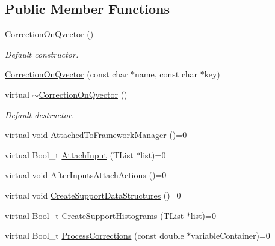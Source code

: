 \subsection*{Public Member Functions}
\begin{DoxyCompactItemize}
\item 
\mbox{\label{classQn_1_1CorrectionOnQvector_a2f3658dab429c296773103d9d6fbd0c6}} 
\mbox{\hyperlink{classQn_1_1CorrectionOnQvector_a2f3658dab429c296773103d9d6fbd0c6}{Correction\+On\+Qvector}} ()
\begin{DoxyCompactList}\small\item\em Default constructor. \end{DoxyCompactList}\item 
\mbox{\hyperlink{classQn_1_1CorrectionOnQvector_af5c630667adbbd37bc6ca51445a8d37f}{Correction\+On\+Qvector}} (const char $\ast$name, const char $\ast$key)
\item 
\mbox{\label{classQn_1_1CorrectionOnQvector_a2b0fdf26c68d941468873e4bcf311b30}} 
virtual \mbox{\hyperlink{classQn_1_1CorrectionOnQvector_a2b0fdf26c68d941468873e4bcf311b30}{$\sim$\+Correction\+On\+Qvector}} ()
\begin{DoxyCompactList}\small\item\em Default destructor. \end{DoxyCompactList}\item 
virtual void \mbox{\hyperlink{classQn_1_1CorrectionOnQvector_ad2d37eb35973c854c7ffa3560a97d510}{Attached\+To\+Framework\+Manager}} ()=0
\item 
virtual Bool\+\_\+t \mbox{\hyperlink{classQn_1_1CorrectionOnQvector_acb7165c2eb071517fa977484bee7e445}{Attach\+Input}} (T\+List $\ast$list)=0
\item 
virtual void \mbox{\hyperlink{classQn_1_1CorrectionOnQvector_afa95ec7804ade8097d92002e0ea05e44}{After\+Inputs\+Attach\+Actions}} ()=0
\item 
virtual void \mbox{\hyperlink{classQn_1_1CorrectionOnQvector_ac7c019bc36ac90618ed6e5fc768ca593}{Create\+Support\+Data\+Structures}} ()=0
\item 
virtual Bool\+\_\+t \mbox{\hyperlink{classQn_1_1CorrectionOnQvector_addcdd98787c99ea34a2511be2cdc8de4}{Create\+Support\+Histograms}} (T\+List $\ast$list)=0
\item 
virtual Bool\+\_\+t \mbox{\hyperlink{classQn_1_1CorrectionOnQvector_a2c2d7f0e48471fb9269f0b5f9aa3e836}{Process\+Corrections}} (const double $\ast$variable\+Container)=0

\end{DoxyCompactItemize}
